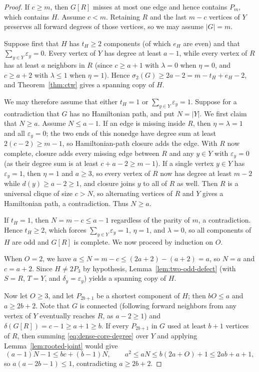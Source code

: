 \documentclass[10pt]{article}
\theoremstyle{compactplain}
\theoremstyle{remark}\newtheorem{remark}[theorem]{Remark}
\begin{document}
\begin{proof}
If $c\ge m$, then $G[R]$ misses at most one edge and hence contains
$P_m$, which contains $H$. Assume $c<m$. Retaining $R$ and the last
$m-c$ vertices of $Y$ preserves all forward degrees of those vertices,
so we may assume $|G|=m$.

Suppose first that $H$ has $t_H\ge2$ components (of which $e_H$ are
even) and that $\sum_{y\in Y}\varepsilon_y=0$. Every vertex of $Y$ has
degree at least $a-1$, while every vertex of $R$ has at least $a$
neighbors in $R$ (since $c\ge a+1$ with $\lambda=0$ when $\eta=0$, and
$c\ge a+2$ with $\lambda\le1$ when $\eta=1$). Hence
$\sigma_2(G)\ge2a-2=m-t_H+e_H-2$, and Theorem~\ref{thm:ctw} gives a
spanning copy of $H$.

We may therefore assume that either $t_H=1$ or
$\sum_{y\in Y}\varepsilon_y=1$. Suppose for a contradiction that $G$ has
no Hamiltonian path, and put $N=|Y|$. We first claim that $N\ge a$.
Assume $N\le a-1$. If an edge is missing inside $R$, then
$\eta=\lambda=1$ and all $\varepsilon_y=0$; the two ends of this
nonedge have degree sum at least $2(c-2)\ge m-1$, so Hamiltonian-path
closure adds the edge. With $R$ now complete, closure adds every missing
edge between $R$ and any $y\in Y$ with $\varepsilon_y=0$ (as their
degree sum is at least $c+a-2\ge m-1$). If a single vertex $y\in Y$ has
$\varepsilon_y=1$, then $\eta=1$ and $a\ge3$, so every vertex of $R$ now
has degree at least $m-2$ while $d(y)\ge a-2\ge1$, and closure joins $y$
to all of $R$ as well. Then $R$ is a universal clique of size $c>N$, so
alternating vertices of $R$ and $Y$ gives a Hamiltonian path, a
contradiction. Thus $N\ge a$.

If $t_H=1$, then $N=m-c\le a-1$ regardless of the parity of $m$, a
contradiction. Hence $t_H\ge2$, which forces $\sum_{y\in Y}\varepsilon_y=1$,
$\eta=1$, and $\lambda=0$, so all components of $H$ are odd and $G[R]$
is complete. We now proceed by induction on $O$.

When $O=2$, we have $a\le N=m-c\le(2a+2)-(a+2)=a$, so $N=a$ and
$c=a+2$. Since $H\ne2P_3$ by hypothesis, Lemma~\ref{lem:two-odd-defect}
(with $S=R$, $T=Y$, and $\delta_y=\varepsilon_y$) yields a spanning copy
of $H$.

Now let $O\ge3$, and let $P_{2b+1}$ be a shortest component of $H$; then
$bO\le a$ and $a\ge2b+2$. Note that $G$ is connected (following forward
neighbors from any vertex of $Y$ eventually reaches $R$, as $a-2\ge1$)
and $\delta(G[R])=c-1\ge a+1\ge b$. If every $P_{2b+1}$ in $G$ used at
least $b+1$ vertices of $R$, then summing \eqref{eq:dense-core-degree}
over $Y$ and applying Lemma~\ref{lem:rooted-joint} would give
\[
 (a-1)N-1\le bc+(b-1)N,\qquad
 a^2\le aN\le b(2a+O)+1\le2ab+a+1,
\]
so $a(a-2b-1)\le1$, contradicting $a\ge2b+2$.


\end{proof}
\end{document}
